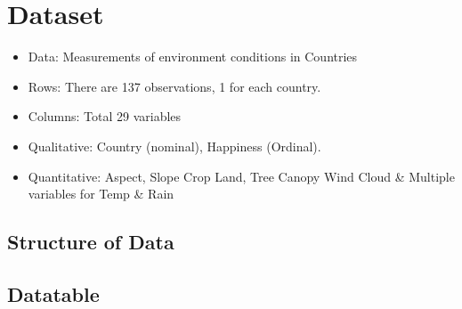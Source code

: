 \documentclass[]{book}
\providecommand{\tightlist}{%
  \setlength{\itemsep}{0pt}\setlength{\parskip}{0pt}}
\begin{document}
\hypertarget{dataset}{%
\chapter{Dataset}\label{dataset}}

\begin{itemize}
\tightlist
\item
  Data: Measurements of environment conditions in Countries
\item
  Rows: There are 137 observations, 1 for each country.
\item
  Columns: Total 29 variables
\item
  Qualitative: Country (nominal), Happiness (Ordinal).
\item
  Quantitative: Aspect, Slope Crop Land, Tree Canopy Wind Cloud \&
  Multiple variables for Temp \& Rain
\end{itemize}

\hypertarget{structure-of-data}{%
\section{Structure of Data}\label{structure-of-data}}

\hypertarget{datatable}{%
\section{Datatable}\label{datatable}}
\end{document}
